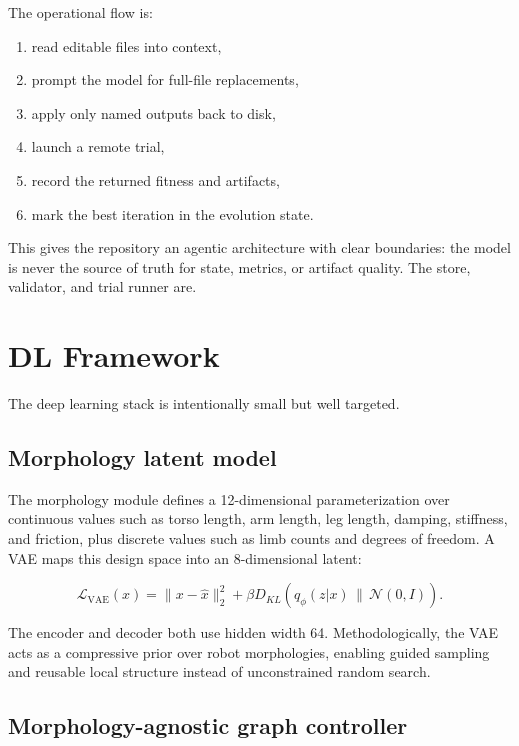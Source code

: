 \documentclass[10pt,letterpaper,twocolumn]{article}
\begin{document}
The operational flow is:

\begin{enumerate}[leftmargin=4mm,itemsep=1pt]
\item read editable files into context,
\item prompt the model for full-file replacements,
\item apply only named outputs back to disk,
\item launch a remote trial,
\item record the returned fitness and artifacts,
\item mark the best iteration in the evolution state.
\end{enumerate}

This gives the repository an agentic architecture with clear boundaries: the model is never the source of truth for state, metrics, or artifact quality. The store, validator, and trial runner are.

\section{DL Framework}

The deep learning stack is intentionally small but well targeted.

\subsection{Morphology latent model}

The morphology module defines a 12-dimensional parameterization over continuous values such as torso length, arm length, leg length, damping, stiffness, and friction, plus discrete values such as limb counts and degrees of freedom. A VAE maps this design space into an 8-dimensional latent:

\begin{equation}
\mathcal{L}_{\text{VAE}}(x)=\lVert x-\hat{x}\rVert_2^2 + \beta D_{KL}\left(q_\phi(z|x)\,\|\,\mathcal{N}(0,I)\right).
\end{equation}

The encoder and decoder both use hidden width 64. Methodologically, the VAE acts as a compressive prior over robot morphologies, enabling guided sampling and reusable local structure instead of unconstrained random search.

\subsection{Morphology-agnostic graph controller}
\end{document}
